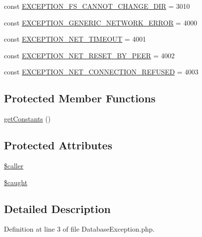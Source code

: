 \begin{DoxyCompactItemize}
\item 
const \hyperlink{class_database_exception_afb0b7d842c8de8754481a086fbaea08d}{E\+X\+C\+E\+P\+T\+I\+O\+N\+\_\+\+F\+S\+\_\+\+C\+A\+N\+N\+O\+T\+\_\+\+C\+H\+A\+N\+G\+E\+\_\+\+D\+I\+R} = 3010
\item 
const \hyperlink{class_database_exception_ab186397805d52a7001f613304dee257a}{E\+X\+C\+E\+P\+T\+I\+O\+N\+\_\+\+G\+E\+N\+E\+R\+I\+C\+\_\+\+N\+E\+T\+W\+O\+R\+K\+\_\+\+E\+R\+R\+O\+R} = 4000
\item 
const \hyperlink{class_database_exception_a53179a0bedcb9a50567afed3ae66baaa}{E\+X\+C\+E\+P\+T\+I\+O\+N\+\_\+\+N\+E\+T\+\_\+\+T\+I\+M\+E\+O\+U\+T} = 4001
\item 
const \hyperlink{class_database_exception_aaa5b45b9fc8dc9eaf84c2b846fbb9cc1}{E\+X\+C\+E\+P\+T\+I\+O\+N\+\_\+\+N\+E\+T\+\_\+\+R\+E\+S\+E\+T\+\_\+\+B\+Y\+\_\+\+P\+E\+E\+R} = 4002
\item 
const \hyperlink{class_database_exception_abbef5bf22fd6bb11a46837ba48e8bf00}{E\+X\+C\+E\+P\+T\+I\+O\+N\+\_\+\+N\+E\+T\+\_\+\+C\+O\+N\+N\+E\+C\+T\+I\+O\+N\+\_\+\+R\+E\+F\+U\+S\+E\+D} = 4003
\end{DoxyCompactItemize}
\subsection*{Protected Member Functions}
\begin{DoxyCompactItemize}
\item 
\hyperlink{class_database_exception_a37357ff7fe8d1c1ea764fa1465637543}{get\+Constants} ()
\end{DoxyCompactItemize}
\subsection*{Protected Attributes}
\begin{DoxyCompactItemize}
\item 
\hyperlink{class_database_exception_a0b21046130eb880a92ca750675597c75}{\$caller}
\item 
\hyperlink{class_database_exception_a461278c71fc5038037fac5e2f5e1c6af}{\$caught}
\end{DoxyCompactItemize}


\subsection{Detailed Description}


Definition at line 3 of file Database\+Exception.\+php.



